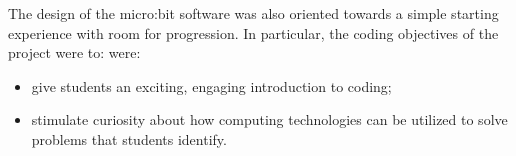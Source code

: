 The design of the micro:bit software was also oriented towards a simple starting experience
with room for progression. In particular, the coding objectives of the project were to:
were:
\begin{itemize}
  \item give students an exciting, engaging introduction to coding;
  \item stimulate curiosity about how computing technologies can be utilized 
  to solve problems that students identify. 
\end{itemize}

%




 




